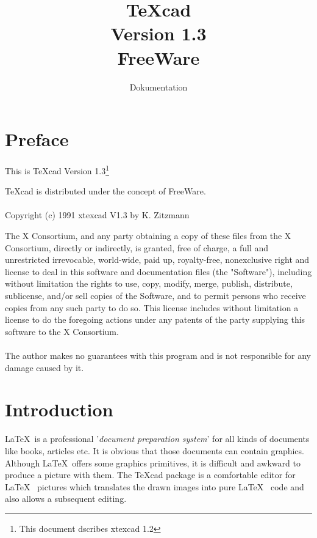 
\parindent0pt




\title{{\Huge TeXcad}\\
       {\large Version 1.3 \\
               {\sc FreeWare}}}
               
\author{Dokumentation}

\maketitle

\section{Preface}

     This is TeXcad Version 1.3\footnote{This document dscribes xtexcad 1.2}
     
  
     TeXcad is distributed under the concept of FreeWare.\\ \\
     Copyright (c) 1991 xtexcad  V1.3 by K. Zitzmann

     The X Consortium, and any party obtaining a copy of these files from
     the X Consortium, directly or indirectly, is granted, free of charge, a
     full and unrestricted irrevocable, world-wide, paid up, royalty-free,
     nonexclusive right and license to deal in this software and
     documentation files (the "Software"), including without limitation the
     rights to use, copy, modify, merge, publish, distribute, sublicense,
     and/or sell copies of the Software, and to permit persons who receive
     copies from any such party to do so.  This license includes without
     limitation a license to do the foregoing actions under any patents of
     the party supplying this software to the X Consortium.\\ \\

     The author makes no guarantees with this program and
     is not responsible for any damage caused by it.
     
     

\section{Introduction}

\LaTeX~is a professional '{\it document preparation system}' for all
kinds of documents like books, articles etc.
It is obvious that those documents can contain graphics.
Although \LaTeX~offers some graphics primitives, it is 
difficult and awkward to produce a picture with them.
The TeXcad package is a comfortable editor for \LaTeX~ pictures
which translates the drawn images into pure \LaTeX~ code and also
allows a subsequent editing.\\
\newline

